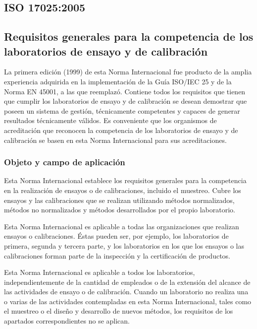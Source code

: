 \subsection{ISO 17025:2005}
\subsection*{Requisitos generales para la competencia de los laboratorios de ensayo y de calibración}

\par 
La primera edición (1999) de esta Norma Internacional fue producto de la amplia experiencia adquirida en la
implementación de la Guía ISO/IEC 25 y de la Norma EN 45001, a las que reemplazó. Contiene todos los
requisitos que tienen que cumplir los laboratorios de ensayo y de calibración se desean demostrar que poseen
un sistema de gestión, técnicamente competentes y capaces de generar resultados técnicamente
válidos. Es conveniente que los organismos de acreditación que reconocen la competencia de los laboratorios de
ensayo y de calibración se basen en esta Norma Internacional para sus acreditaciones.\cite{iso17025}

\subsubsection{Objeto y campo de aplicación}
\par
Esta Norma Internacional establece los requisitos generales para la competencia en la realización de
ensayos o de calibraciones, incluido el muestreo. Cubre los ensayos y las calibraciones que se realizan
utilizando métodos normalizados, métodos no normalizados y métodos desarrollados por el propio laboratorio.

\par \noindent
Esta Norma Internacional es aplicable a todas las organizaciones que realizan ensayos o calibraciones.
Éstas pueden ser, por ejemplo, los laboratorios de primera, segunda y tercera parte, y los laboratorios en los que los ensayos o las calibraciones forman parte de la inspección y la certificación de productos.

\par \noindent
Esta Norma Internacional es aplicable a todos los laboratorios, independientemente de la cantidad de
empleados o de la extensión del alcance de las actividades de ensayo o de calibración. Cuando un laboratorio no realiza una o varias de las actividades contempladas en esta Norma Internacional, tales como el muestreo o el diseño y desarrollo de nuevos métodos, los requisitos de los apartados correspondientes no se aplican.

